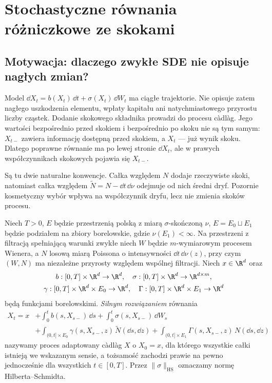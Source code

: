 \chapter{Stochastyczne równania różniczkowe ze skokami}
\label{ch:jump-sde}

\section{Motywacja: dlaczego zwykłe SDE nie opisuje nagłych zmian?}

Model $\dd X_t=b(X_t)\,\dd t+\sigma(X_t)\,\dd W_t$ ma ciągłe
trajektorie. Nie opisuje zatem nagłego uszkodzenia elementu, wpłaty
kapitału ani natychmiastowego przyrostu liczby cząstek. Dodanie
skokowego składnika prowadzi do procesu càdlàg. Jego wartości
bezpośrednio przed skokiem i bezpośrednio po skoku nie są tym samym:
$X_{t-}$ zawiera informację dostępną przed skokiem, a $X_t$ ---
już wynik skoku. Dlatego poprawne równanie ma po lewej stronie
$\dd X_t$, ale w prawych współczynnikach skokowych pojawia się
$X_{t-}$.

Są tu dwie naturalne konwencje. Całka względem $N$ dodaje
rzeczywiste skoki, natomiast całka względem
$\widetilde N=N-\dd t\,\dd\nu$ odejmuje od nich średni dryf.
Pozornie kosmetyczny wybór wpływa na współczynnik dryfu, lecz
nie zmienia skoków procesu.

\begin{definicja}
\label{def:jump-sde}
Niech $T>0$, $E$ będzie przestrzenią polską z miarą
$\sigma$-skończoną $\nu$, $E=E_0\sqcup E_1$ będzie podziałem
na zbiory borelowskie, gdzie $\nu(E_1)<\infty$.
Na przestrzeni z filtracją spełniającą warunki zwykłe niech $W$
będzie $m$-wymiarowym procesem Wienera, a $N$ losową miarą
Poissona o intensywności $\dd t\,\dd\nu(z)$, przy czym
$(W,N)$ ma niezależne przyrosty względem wspólnej filtracji.
Niech $x\in\R^d$ oraz
\[
\begin{gathered}
b:[0,T]\times\R^d\to\R^d,\quad
\sigma:[0,T]\times\R^d\to\R^{d\times m},\\
\gamma:[0,T]\times\R^d\times E_0\to\R^d,\quad
\Gamma:[0,T]\times\R^d\times E_1\to\R^d
\end{gathered}
\]
będą funkcjami borelowskimi. \emph{Silnym rozwiązaniem} równania
\[
\begin{split}
X_t=x&+\int_0^t b(s,X_{s-})\,\dd s
 +\int_0^t\sigma(s,X_{s-})\,\dd W_s\\
&+\int_{(0,t]\times E_0}\gamma(s,X_{s-},z)\,\widetilde N(\dd s,\dd z)
 +\int_{(0,t]\times E_1}\Gamma(s,X_{s-},z)\,N(\dd s,\dd z)
\end{split}
\tag{13.1}\label{eq:jump-sde}
\]
nazywamy proces adaptowany càdlàg $X$ o $X_0=x$, dla którego
wszystkie całki istnieją we wskazanym sensie, a tożsamość zachodzi
prawie na pewno jednocześnie dla wszystkich $t\in[0,T]$.
Przez $\|\sigma\|_{\mathrm{HS}}$ oznaczamy normę Hilberta--Schmidta.
\end{definicja}

